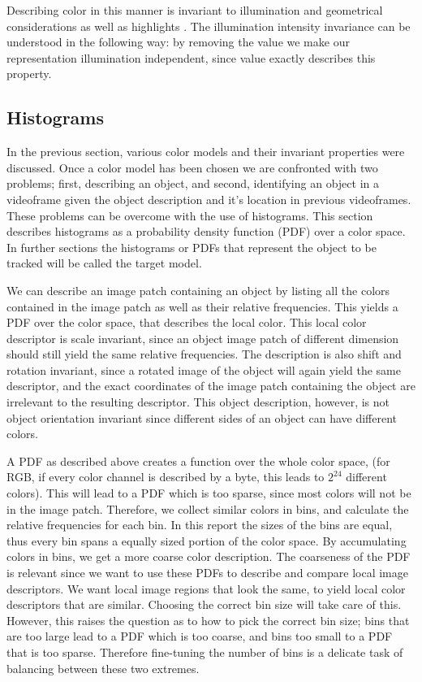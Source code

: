 \documentclass[a4paper,11pt]{article}
\begin{document}
Describing color in this manner is invariant to illumination and geometrical considerations as well as highlights \cite{gevers_invariant}. The illumination intensity invariance can be understood in the following way: by removing the value we make our representation illumination independent, since value exactly describes this property.

\subsection{Histograms}

In the previous section, various color models and their invariant properties were discussed. Once a color model has been chosen we are confronted with two problems; first, describing an object, and second, identifying an object in a videoframe given the object description and it's location in previous videoframes. These problems can be overcome with the use of histograms. This section describes histograms as a probability density function (PDF) over a color space. In further sections the histograms or PDFs that represent the object to be tracked will be called the target model.

We can describe an image patch containing an object by listing all the colors contained in the image patch as well as their relative frequencies. This yields a PDF over the color space, that describes the local color. This local color descriptor is scale invariant, since an object image patch of different dimension should still yield the same relative frequencies. The description is also shift and rotation invariant, since a rotated image of the object will again yield the same descriptor, and the exact coordinates of the image patch containing the object are irrelevant to the resulting descriptor. This object description, however, is not object orientation invariant since different sides of an object can have different colors. 

A PDF as described above creates a function over the whole color space, (for RGB, if every color channel is described by a byte, this leads to $2^{24}$ different colors). This will lead to a PDF which is too sparse, since most colors will not be in the image patch. Therefore, we collect similar colors in bins, and calculate the relative frequencies for each bin. In this report the sizes of the bins are equal, thus every bin spans a equally sized portion of the color space. By accumulating colors in bins, we get a more coarse color description. The coarseness of the PDF is relevant since we want to use these PDFs to describe and compare local image descriptors. We want local image regions that look the same, to yield local color descriptors that are similar.  Choosing the correct bin size will take care of this. However, this raises the question as to how to pick the correct bin size; bins that are too large lead to a PDF which is too coarse, and bins too small to a PDF that is too sparse. Therefore fine-tuning the number of bins is a delicate task of balancing between these two extremes. 
\end{document}
